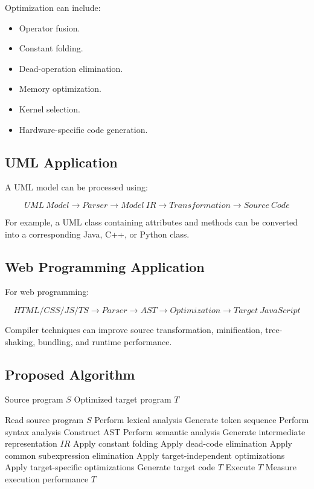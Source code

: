 \documentclass[12pt,a4paper]{article}
\begin{document}
Optimization can include:

\begin{itemize}
    \item Operator fusion.
    \item Constant folding.
    \item Dead-operation elimination.
    \item Memory optimization.
    \item Kernel selection.
    \item Hardware-specific code generation.
\end{itemize}

\subsection{UML Application}

A UML model can be processed using:

\[
UML\ Model
\rightarrow Parser
\rightarrow Model\ IR
\rightarrow Transformation
\rightarrow Source\ Code
\]

For example, a UML class containing attributes and methods can be converted
into a corresponding Java, C++, or Python class.

\subsection{Web Programming Application}

For web programming:

\[
HTML/CSS/JS/TS
\rightarrow Parser
\rightarrow AST
\rightarrow Optimization
\rightarrow Target\ JavaScript
\]

Compiler techniques can improve source transformation, minification,
tree-shaking, bundling, and runtime performance.

\subsection{Proposed Algorithm}

\begin{algorithm}[H]
\caption{Integrated Compiler Processing Algorithm}
\label{alg:compiler}
\begin{algorithmic}[1]

\Require Source program $S$
\Ensure Optimized target program $T$

\State Read source program $S$
\State Perform lexical analysis
\State Generate token sequence
\State Perform syntax analysis
\State Construct AST
\State Perform semantic analysis
\State Generate intermediate representation $IR$
\State Apply constant folding
\State Apply dead-code elimination
\State Apply common subexpression elimination
\State Apply target-independent optimizations
\State Apply target-specific optimizations
\State Generate target code $T$
\State Execute $T$
\State Measure execution performance
\State \Return $T$

\end{algorithmic}
\end{algorithm}
\end{document}

